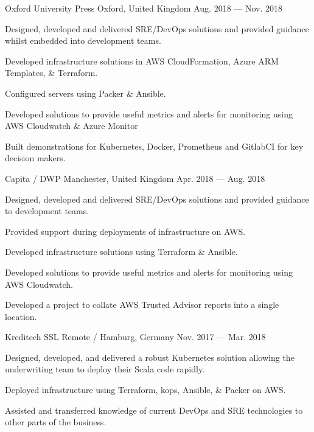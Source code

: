 \begin{cventries}
    {Oxford University Press}
    {Oxford, United Kingdom}
    {Aug. 2018 — Nov. 2018}
    {
        \begin{cvitems}
            \item{Designed, developed and delivered SRE/DevOps solutions and provided guidance whilst embedded into development teams.}
            \item{Developed infrastructure solutions in AWS CloudFormation, Azure ARM Templates, \& Terraform.}
            \item{Configured servers using Packer \& Ansible.}
            \item{Developed solutions to provide useful metrics and alerts for monitoring using AWS Cloudwatch \& Azure Monitor}
            \item{Built demonstrations for Kubernetes, Docker, Prometheus and GitlabCI for key decision makers.}
        \end{cvitems}
    }
    
    {Capita / DWP}
    {Manchester, United Kingdom}
    {Apr. 2018 — Aug. 2018}
    {
        \begin{cvitems}
            \item{Designed, developed and delivered SRE/DevOps solutions and provided guidance to development teams.}
            \item{Provided support during deployments of infrastructure on AWS.}
            \item{Developed infrastructure solutions using Terraform \& Ansible.}
            \item{Developed solutions to provide useful metrics and alerts for monitoring using AWS Cloudwatch.}
            \item{Developed a project to collate AWS Trusted Advisor reports into a single location.}
        \end{cvitems}
    }

    {Kreditech SSL}
    {Remote / Hamburg, Germany}
    {Nov. 2017 — Mar. 2018}
    {
        \begin{cvitems}
            \item{Designed, developed, and delivered a robust Kubernetes solution allowing the underwriting team to deploy their Scala code rapidly.}
            \item{Deployed infrastructure using Terraform, kops, Ansible, \& Packer on AWS.}
            \item{Assisted and transferred knowledge of current DevOps and SRE technologies to other parts of the business.}
        \end{cvitems}
    }


\end{cventries}
